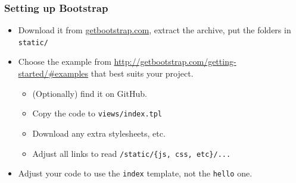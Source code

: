\documentclass{beamer}
\begin{document}
\begin{frame}[fragile]
\frametitle{Setting up Bootstrap}
\begin{itemize}
  \item Download it from \url{getbootstrap.com}, extract the archive,
    put the folders in \texttt{static/}
  \item Choose the example from
    \url{http://getbootstrap.com/getting-started/#examples} that best
    suits your project.
    \begin{itemize}
    \item (Optionally) find it on GitHub.
    \item Copy the code to \texttt{views/index.tpl}
    \item Download any extra stylesheets, etc.
    \item Adjust all links to read \texttt{/static/\{js, css, etc\}/...}
    \end{itemize}
  \item Adjust your code to use the \texttt{index} template, not the
  \texttt{hello} one.
\end{itemize}
\end{frame}
\end{document}
